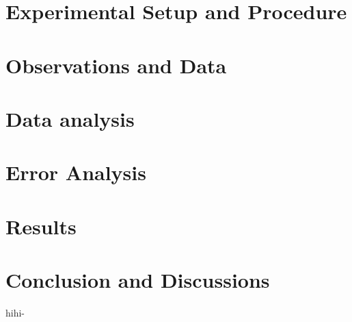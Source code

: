 \documentclass{article}
\begin{document}
\begin{multicols}{2}
\section{\label{expsetup}Experimental Setup and Procedure }

\section{\label{observations}Observations and Data}

\section{\label{dataanalysis}Data analysis}
\section{\label{error}Error Analysis}

\section{\label{results}Results}

\section{\label{Conclusion}Conclusion and Discussions}

hihi-\cite{ROOT}

\end{multicols}


\end{document}
